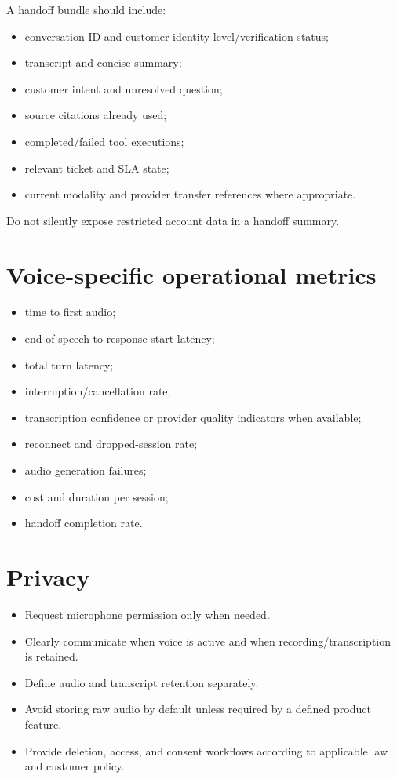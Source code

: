 A handoff bundle should include:

\begin{itemize}
\item conversation ID and customer identity level/verification status;
\item transcript and concise summary;
\item customer intent and unresolved question;
\item source citations already used;
\item completed/failed tool executions;
\item relevant ticket and SLA state;
\item current modality and provider transfer references where appropriate.
\end{itemize}
Do not silently expose restricted account data in a handoff summary.

\section{Voice-specific operational metrics}

\begin{itemize}
\item time to first audio;
\item end-of-speech to response-start latency;
\item total turn latency;
\item interruption/cancellation rate;
\item transcription confidence or provider quality indicators when available;
\item reconnect and dropped-session rate;
\item audio generation failures;
\item cost and duration per session;
\item handoff completion rate.
\end{itemize}
\section{Privacy}

\begin{itemize}
\item Request microphone permission only when needed.
\item Clearly communicate when voice is active and when recording/transcription is retained.
\item Define audio and transcript retention separately.
\item Avoid storing raw audio by default unless required by a defined product feature.
\item Provide deletion, access, and consent workflows according to applicable law and customer policy.
\end{itemize}
